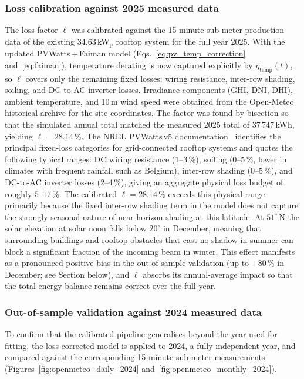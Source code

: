 \documentclass[11pt,a4paper]{report}
\begin{document}
\subsubsection*{Loss calibration against 2025 measured data}

The loss factor $\ell$ was calibrated against the 15-minute sub-meter production
data of the existing 34.63\,kW$_\mathrm{p}$ rooftop system for the full year 2025.
With the updated PVWatts\,+\,Faiman model (Eqs.~\eqref{eq:pv_temp_correction}
and~\eqref{eq:faiman}), temperature derating is now captured explicitly by
$\eta_\mathrm{temp}(t)$, so $\ell$ covers only the remaining fixed losses:
wiring resistance, inter-row shading, soiling, and DC-to-AC inverter losses.
Irradiance components (GHI, DNI, DHI), ambient temperature, and 10\,m wind speed
were obtained from the Open-Meteo historical archive for the site coordinates.
The factor was found by bisection so that the simulated annual total matched
the measured 2025 total of 37\,747\,kWh, yielding $\ell = 28.14\,\%$.
The NREL PVWatts\,v5 documentation~\cite{Dobos2014PVWatts} identifies the
principal fixed-loss categories for grid-connected rooftop systems and quotes
the following typical ranges: DC wiring resistance ($1$--$3\,\%$), soiling
($0$--$5\,\%$, lower in climates with frequent rainfall such as Belgium), inter-row
shading ($0$--$5\,\%$), and DC-to-AC inverter losses ($2$--$4\,\%$), giving an
aggregate physical loss budget of roughly $5$--$17\,\%$.
The calibrated $\ell = 28.14\,\%$ exceeds this physical range primarily because the
fixed inter-row shading term in the model does not capture the strongly seasonal
nature of near-horizon shading at this latitude.
At $51^{\circ}$\,N the solar elevation at solar noon falls below $20^{\circ}$ in
December, meaning that surrounding buildings and rooftop obstacles that cast no shadow
in summer can block a significant fraction of the incoming beam in winter.
This effect manifests as a pronounced positive bias in the out-of-sample validation
(up to $+80\,\%$ in December; see Section below), and $\ell$ absorbs its
annual-average impact so that the total energy balance remains correct over the full year.

\subsubsection*{Out-of-sample validation against 2024 measured data}

To confirm that the calibrated pipeline generalises beyond the year used for fitting,
the loss-corrected model is applied to 2024, a fully independent year, and
compared against the corresponding 15-minute sub-meter measurements
(Figures~\ref{fig:openmeteo_daily_2024} and~\ref{fig:openmeteo_monthly_2024}).
\end{document}
